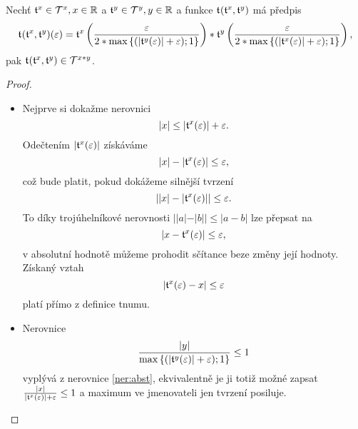 \begin{theorem}\label{vet:soucin_dvou_tnumu}
Nechť $\mathfrak{t}^{x}\in\mathcal{T}^{x},x\in\mathbb{R}$ a $\mathfrak{t}^{y}\in\mathcal{T}^{y},y\in\mathbb{R}$ a funkce $\mathfrak{t}^{}(\mathfrak{t}^{x},\mathfrak{t}^{y})$ má předpis
\begin{equation}
\mathfrak{t}^{}(\mathfrak{t}^{x},\mathfrak{t}^{y})(\varepsilon)=\mathfrak{t}^{x}\left(\frac{\varepsilon}{2*\mathrm{max}\left\{(|\mathfrak{t}^{y}(\varepsilon)| + \varepsilon);1\right\}}\right)*\mathfrak{t}^{y}\left(\frac{\varepsilon}{2*\mathrm{max}\left\{(|\mathfrak{t}^{x}(\varepsilon)| + \varepsilon);1\right\}}\right),
\end{equation}
pak $\mathfrak{t}^{}(\mathfrak{t}^{x},\mathfrak{t}^{y})\in\mathcal{T}^{x*y}$.

\begin{proof}
\begin{itemize}\item{
Nejprve si dokažme nerovnici
\begin{equation}\label{ner:abst}
|x|\leq|\mathfrak{t}^{x}(\varepsilon)|+\varepsilon.
\end{equation}
Odečtením $|\mathfrak{t}^{x}(\varepsilon)|$ získáváme
\begin{equation}
|x|-|\mathfrak{t}^{x}(\varepsilon)|\leq\varepsilon,
\end{equation}
což bude platit, pokud dokážeme silnější tvrzení
\begin{equation}
||x|-|\mathfrak{t}^{x}(\varepsilon)||\leq\varepsilon.
\end{equation}
To díky trojúhelníkové nerovnosti $||a|-|b||\leq|a-b|$ lze přepsat na
\begin{equation}
|x-\mathfrak{t}^{x}(\varepsilon)|\leq\varepsilon,
\end{equation}
v absolutní hodnotě můžeme prohodit sčítance beze změny její hodnoty. Získaný vztah
\begin{equation}
|\mathfrak{t}^{x}(\varepsilon)-x|\leq\varepsilon
\end{equation}
platí přímo z definice tnumu.}

\item{Nerovnice
\begin{equation}\label{ner:abst2}
\frac{|y|}{\mathrm{max}\left\{(|\mathfrak{t}^{y}(\varepsilon)| + \varepsilon);1\right\}}\leq 1
\end{equation}
vyplývá z nerovnice \eqref{ner:abst}, ekvivalentně je ji totiž možné zapsat $\frac{|x|}{|\mathfrak{t}^{x}(\varepsilon)|+\varepsilon}\leq 1$ a maximum ve jmenovateli jen tvrzení posiluje.}


\end{itemize}
\end{proof}
\end{theorem}
